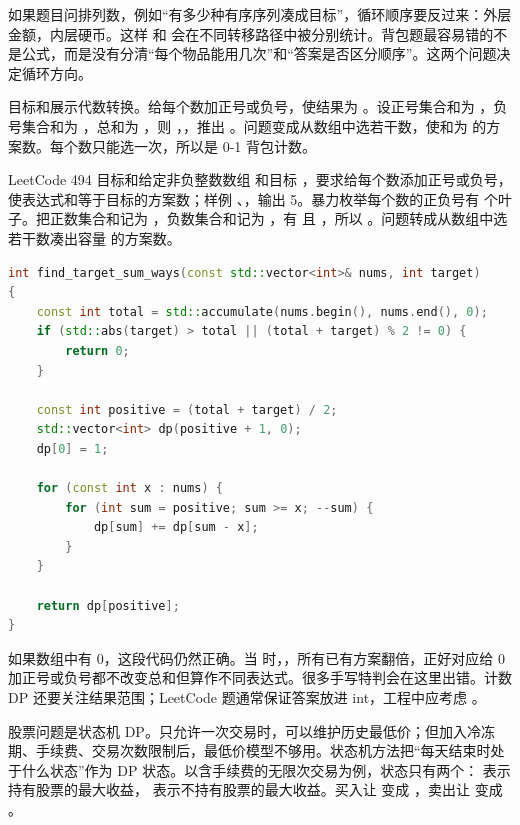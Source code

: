 如果题目问排列数，例如“有多少种有序序列凑成目标”，循环顺序要反过来：外层金额，内层硬币。这样  和  会在不同转移路径中被分别统计。背包题最容易错的不是公式，而是没有分清“每个物品能用几次”和“答案是否区分顺序”。这两个问题决定循环方向。

目标和展示代数转换。给每个数加正号或负号，使结果为 。设正号集合和为 ，负号集合和为 ，总和为 ，则 ，，推出 。问题变成从数组中选若干数，使和为  的方案数。每个数只能选一次，所以是 0-1 背包计数。

LeetCode 494 目标和给定非负整数数组  和目标 ，要求给每个数添加正号或负号，使表达式和等于目标的方案数；样例 、，输出 5。暴力枚举每个数的正负号有  个叶子。把正数集合和记为 ，负数集合和记为 ，有  且 ，所以 。问题转成从数组中选若干数凑出容量  的方案数。

\begin{lstlisting}[language=C++,caption={LeetCode 494 目标和：0-1 背包计数}]
int find_target_sum_ways(const std::vector<int>& nums, int target)
{
    const int total = std::accumulate(nums.begin(), nums.end(), 0);
    if (std::abs(target) > total || (total + target) % 2 != 0) {
        return 0;
    }

    const int positive = (total + target) / 2;
    std::vector<int> dp(positive + 1, 0);
    dp[0] = 1;

    for (const int x : nums) {
        for (int sum = positive; sum >= x; --sum) {
            dp[sum] += dp[sum - x];
        }
    }

    return dp[positive];
}
\end{lstlisting}

如果数组中有 0，这段代码仍然正确。当  时，，所有已有方案翻倍，正好对应给 0 加正号或负号都不改变总和但算作不同表达式。很多手写特判会在这里出错。计数 DP 还要关注结果范围；LeetCode 题通常保证答案放进 int，工程中应考虑 。

股票问题是状态机 DP。只允许一次交易时，可以维护历史最低价；但加入冷冻期、手续费、交易次数限制后，最低价模型不够用。状态机方法把“每天结束时处于什么状态”作为 DP 状态。以含手续费的无限次交易为例，状态只有两个： 表示持有股票的最大收益， 表示不持有股票的最大收益。买入让  变成 ，卖出让  变成 。

